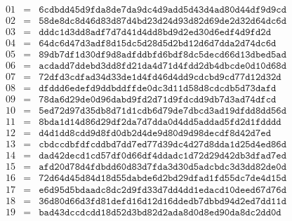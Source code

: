 \begin{multicols}{2}
\[\begin{array}{rcl}
01 &=& \texttt{6cdbdd45d9fda8de7da9dc4d9add5d43d4ad80d44df9d9cd} \\
02 &=& \texttt{58de8dc8d46d83d87d4bd23d24d93d82d69de2d32d64dc6d} \\
03 &=& \texttt{dddc1d3dd8adf7d7d41d4dd8bd9d2ed30d6edf4d9fd2d} \\
04 &=& \texttt{64dc6d47d3adf8d15dc5d28d5d2bd12d6d7dda2d74dc6d} \\
05 &=& \texttt{89db7df1d30df9d8adfddbfd6bdf8dc5decd66d13dbed5ad} \\
06 &=& \texttt{acdadd7ddebd3dd8fd21da4d71d4fdd2db4dbcde0d10d68d} \\
07 &=& \texttt{72dfd3cdfad34d33de1d4fd46d4dd9cdcbd9cd77d12d32d} \\
08 &=& \texttt{dfddd6edefd9ddbddffde0dc3d11d58d8cdcdb5d73dafd} \\
09 &=& \texttt{78da6d29de0d96dabd9fd2d71d9fdcdd9db7d3ad74dfcd} \\
10 &=& \texttt{5ed72d97d35db8d71d1cdb6d79de7dbcd3ad19dfdd8dd56d} \\
11 &=& \texttt{8bda1d14d86d29df2da7d7dda0d4dd5addad5fd2d1fdddd} \\
12 &=& \texttt{d4d1dd8cdd9d8fd0db2d4de9d80d9d98decdf8d42d7ed} \\
13 &=& \texttt{cbdccdbfdfcddbd7dd7ed77d39dc4d27d8dda1d25d4ed86d} \\
14 &=& \texttt{dad42decd1cd57df0d66df4ddadc1d72d29d42db3dfad7ed} \\
15 &=& \texttt{afd20d78d4fdbdd60d83d7fda3d30d5adcbdc3d3dd82de0d} \\
16 &=& \texttt{72d64d45d84d18d55dabde6d2bd29dfad1fd55dc7de4d15d} \\
17 &=& \texttt{e6d95d5bdaadc8dc2d9fd33d7dd4dd1edacd10deed67d76d} \\
18 &=& \texttt{36d80d66d3fd81defd16d12d16ddedb7dbbd94d2ed7dd11d} \\
19 &=& \texttt{bad43dccdcdd18d52d3bd82d2ada8d0d8ed90da8dc2dd0d} \\


\end{array}\]
\end{multicols}
